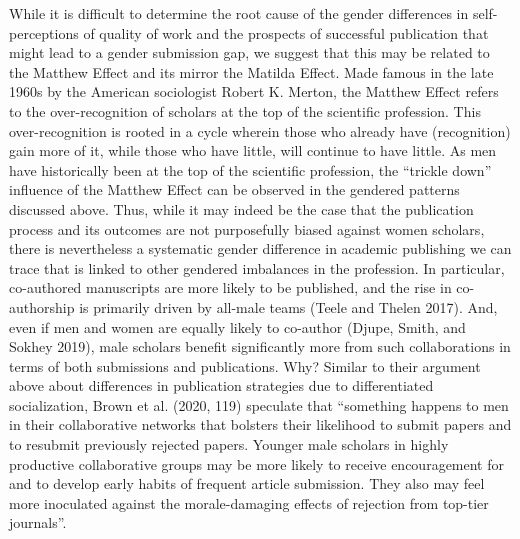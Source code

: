 \documentclass[
]{ccr}
\begin{document}
While it is difficult to determine the root cause of the gender
differences in self-perceptions of quality of work and the prospects of
successful publication that might lead to a gender submission gap, we
suggest that this may be related to the Matthew Effect and its mirror
the Matilda Effect. Made famous in the late 1960s by the American
sociologist Robert K. Merton, the Matthew Effect refers to the
over-recognition of scholars at the top of the scientific profession.
This over-recognition is rooted in a cycle wherein those who already
have (recognition) gain more of it, while those who have little, will
continue to have little. As men have historically been at the top of the
scientific profession, the ``trickle down'' influence of the Matthew
Effect can be observed in the gendered patterns discussed above. Thus,
while it may indeed be the case that the publication process and its
outcomes are not purposefully biased against women scholars, there is
nevertheless a systematic gender difference in academic publishing we
can trace that is linked to other gendered imbalances in the profession.
In particular, co-authored manuscripts are more likely to be published,
and the rise in co-authorship is primarily driven by all-male teams
(Teele and Thelen 2017). And, even if men and women are equally likely
to co-author (Djupe, Smith, and Sokhey 2019), male scholars benefit
significantly more from such collaborations in terms of both submissions
and publications. Why? Similar to their argument above about differences
in publication strategies due to differentiated socialization, Brown et
al. (2020, 119) speculate that ``something happens to men in their
collaborative networks that bolsters their likelihood to submit papers
and to resubmit previously rejected papers. Younger male scholars in
highly productive collaborative groups may be more likely to receive
encouragement for and to develop early habits of frequent article
submission. They also may feel more inoculated against the
morale-damaging effects of rejection from top-tier journals''.
\end{document}
